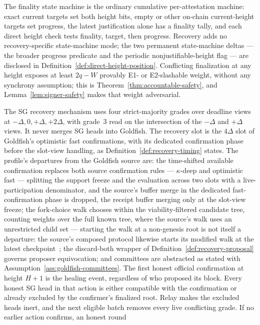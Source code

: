 The finality state machine is the ordinary cumulative per-attestation
machine: exact current targets set both height bits, empty or other on-chain
current-height targets set progress, the latest justification alone has a
finality tally, and each direct height check tests finality, target, then progress.
Recovery adds no recovery-specific state-machine mode; the two permanent
state-machine deltas --- the broader progress predicate and the periodic
nonjustifiable-height flag --- are disclosed in
Definition~\ref{def:direct-height-position}.
Conflicting finalization at any height exposes at least \(2q-W\) provably E1- or
E2-slashable weight, without any synchrony assumption; this is
Theorem~\ref{thm:accountable-safety}, and
Lemma~\ref{lem:signer-safety} makes that weight adversarial.

The SG recovery mechanism uses four strict-majority grades over deadline views at
\(-\Delta,0,+\Delta,+2\Delta\), with grade~3 read on the intersection
of the \(-\Delta\) and \(+\Delta\) views.  It never merges SG heads into Goldfish.
The recovery slot is the \(4\Delta\) slot of Goldfish's optimistic
fast confirmations, with its dedicated confirmation phase before the
slot-view handling, as Definition~\ref{def:recovery-timing} states.  The
profile's departures from the Goldfish source are: the time-shifted
available confirmation replaces both source confirmation rules ---
\(\kappa\)-deep and optimistic fast --- splitting the support freeze
and the evaluation across two slots with a live-participation
denominator, and the source's buffer merge in the dedicated
fast-confirmation phase is dropped, the receipt buffer merging only at
the slot-view freeze; the fork-choice walk chooses within the
viability-filtered candidate
tree, counting weights over the full known tree, where the source's
walk uses an unrestricted child set --- starting the walk at a non-genesis
root is not itself a departure: the source's composed protocol likewise
starts its modified walk at the latest checkpoint~\cite{goldfish};
the discard-both wrapper of
Definition~\ref{def:recovery-proposal} governs proposer equivocation;
and committees are abstracted as stated with
Assumption~\ref{ass:goldfish-committees}.  The
first honest official confirmation at height \(H+1\) is the healing event,
regardless of who proposed its block.  Every honest SG head in that action is
either compatible with the confirmation or already excluded by the
confirmer's finalized root.  Relay makes the excluded heads inert, and the
next eligible batch removes every live conflicting grade.  If no earlier action confirms, an honest round
